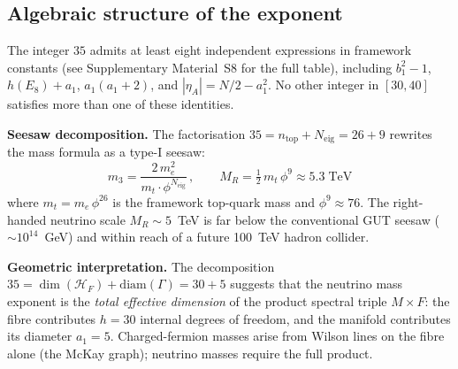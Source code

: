 \documentclass[12pt,a4paper]{article}
\theoremstyle{definition}
\begin{document}
\subsection{Algebraic structure of the exponent}\label{sec:nu_exponent}

The integer $35$ admits at least eight independent expressions in framework constants (see Supplementary Material~S8 for the full table), including $b_1^2 - 1$, $h(E_8) + a_1$, $a_1(a_1+2)$, and $|\eta_A| = N/2 - a_1^2$.  No other integer in $[30,40]$ satisfies more than one of these identities.

\textbf{Seesaw decomposition.}  The factorisation $35 = n_{\text{top}} + N_{\text{eig}} = 26 + 9$ rewrites the mass formula as a type-I seesaw:
\begin{equation}
m_3 = \frac{2\,m_e^2}{m_t \cdot \phi^{N_{\text{eig}}}} \,,\qquad
M_R = \tfrac{1}{2}\,m_t\,\phi^{9} \approx 5.3\;\text{TeV}
\label{eq:seesaw}
\end{equation}
where $m_t = m_e\,\phi^{26}$ is the framework top-quark mass and $\phi^9 \approx 76$.  The right-handed neutrino scale $M_R \sim 5$~TeV is far below the conventional GUT seesaw ($\sim\!10^{14}$~GeV) and within reach of a future 100~TeV hadron collider.

\textbf{Geometric interpretation.}  The decomposition $35 = \dim(\mathcal{H}_F) + \mathrm{diam}(\Gamma) = 30 + 5$ suggests that the neutrino mass exponent is the \emph{total effective dimension} of the product spectral triple $M \times F$: the fibre contributes $h = 30$ internal degrees of freedom, and the manifold contributes its diameter $a_1 = 5$.  Charged-fermion masses arise from Wilson lines on the fibre alone (the McKay graph); neutrino masses require the full product.
\end{document}
